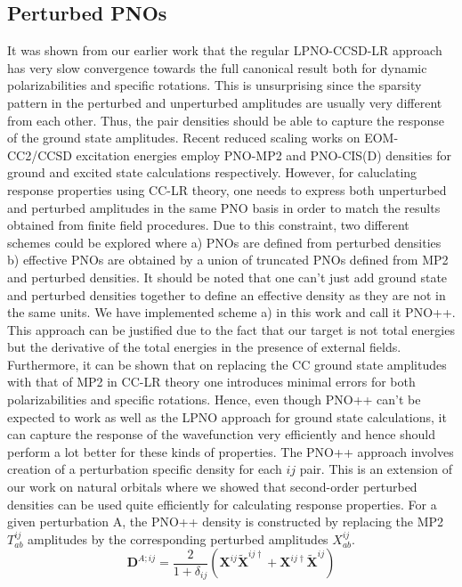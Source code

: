 \subsection{Perturbed PNOs}
It was shown from our earlier work that the regular LPNO-CCSD-LR approach has
very slow convergence towards the full canonical result both for dynamic polarizabilities
and specific rotations. This is unsurprising since the sparsity pattern in the perturbed 
and unperturbed amplitudes are usually very different from each other. Thus, the 
pair densities should be able to capture the response of the ground state amplitudes. 
Recent reduced scaling works on EOM-CC2/CCSD excitation energies employ 
PNO-MP2 and PNO-CIS(D) densities for ground and excited state calculations respectively.\cite{Hattig13,Hattig18}
However, for caluclating response properties using CC-LR theory, one needs to express both 
unperturbed and perturbed amplitudes in the same PNO basis in order to match the results
obtained from finite field procedures. Due to this constraint, two different 
schemes could be explored where a) PNOs are defined from perturbed densities b) effective PNOs 
are obtained by a union of truncated PNOs defined from MP2 and perturbed densities. It should
be noted that one can't just add ground state and perturbed densities together to define an effective
density as they are not in the same units. We have implemented scheme a) in this work and call it PNO++.
This approach can be justified due to the fact that our target is not total energies but the 
derivative of the total energies in the presence of external fields. Furthermore, it can
be shown that on replacing the CC ground state amplitudes with that of MP2 in CC-LR theory
one introduces minimal errors for both polarizabilities and specific rotations.\cite{Kumar18:1} 
Hence, even though PNO++ can't be expected to work as well as the LPNO approach for ground state 
calculations, it can capture the response of the wavefunction very efficiently and 
hence should perform a lot better for these kinds of properties. The PNO++ approach
involves creation of a perturbation specific density for each $ij$ pair. 
This is an extension of our work on natural orbitals where we showed that second-order
perturbed densities can be used quite efficiently for calculating response properties\cite{Kumar18:1}.
For a given perturbation A, the PNO++ density is constructed by replacing the MP2 
$T^{ij}_{ab}$ amplitudes by the corresponding perturbed amplitudes $X^{ij}_{ab}$.
\\
\begin{equation}
\bm{D}^{A;ij} = \frac{2}{1+\delta_{ij}} (\bm{X}^{ij}\bm{\tilde{X}}^{ij\dagger} + \bm{X}^{ij\dagger}\bm{\tilde{X}}^{ij})
\end{equation}
